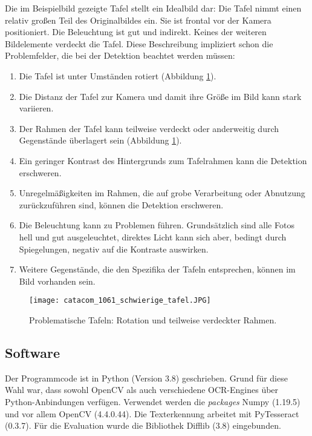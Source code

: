 Die im Beispielbild gezeigte Tafel stellt  ein Idealbild dar: Die Tafel nimmt einen relativ großen Teil des Originalbildes ein. Sie ist frontal vor der Kamera positioniert. Die Beleuchtung ist gut und indirekt. Keines der weiteren Bildelemente verdeckt die Tafel.
Diese Beschreibung impliziert schon die Problemfelder, die bei der Detektion beachtet werden müssen:
\begin{enumerate}
\item Die Tafel ist unter Umständen rotiert (Abbildung \ref{fig:schwierigetafel}).
\item Die Distanz der Tafel zur Kamera und damit ihre Größe im Bild kann stark variieren.
\item Der Rahmen der Tafel kann teilweise verdeckt oder anderweitig durch Gegenstände überlagert sein (Abbildung \ref{fig:schwierigetafel}).
\item Ein geringer Kontrast des Hintergrunds zum Tafelrahmen kann die Detektion erschweren. %
\item Unregelmäßigkeiten im Rahmen, die auf grobe Verarbeitung oder Abnutzung zurückzuführen sind, können die Detektion erschweren.
\item Die Beleuchtung kann zu Problemen führen. Grundsätzlich sind alle Fotos hell und gut ausgeleuchtet, direktes Licht kann sich aber, bedingt durch Spiegelungen, negativ auf die Kontraste auswirken.
\item Weitere Gegenstände, die den Spezifika der Tafeln entsprechen, können im Bild vorhanden sein.
\end{enumerate}
\begin{figure}[!h]
\centering
\texttt{[image: catacom\_1061\_schwierige\_tafel.JPG]}
\caption{Problematische Tafeln: Rotation und teilweise verdeckter Rahmen.}
\label{fig:schwierigetafel}
\end{figure}

\subsection{Software}

Der Programmcode ist in Python (Version 3.8) geschrieben. Grund für diese Wahl war, dass sowohl OpenCV als auch verschiedene OCR-Engines über Python-Anbindungen verfügen. Verwendet werden die \textit{packages} Numpy (1.19.5) und vor allem OpenCV (4.4.0.44). Die Texterkennung arbeitet mit PyTesseract (0.3.7). Für die Evaluation wurde die Bibliothek Difflib (3.8) eingebunden.

